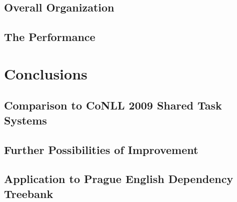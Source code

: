 \documentclass[12pt,notitlepage]{report}
\begin{document}
\section{Overall Organization}
\section{The Performance}

\chapter{Conclusions}\label{conclusions}
\section{Comparison to CoNLL 2009 Shared Task Systems}
\section{Further Possibilities of Improvement}
\section{Application to Prague English Dependency Treebank}

\cleardoublepage
{}
\printnomenclature[2cm]
\cleardoublepage


\end{document}

